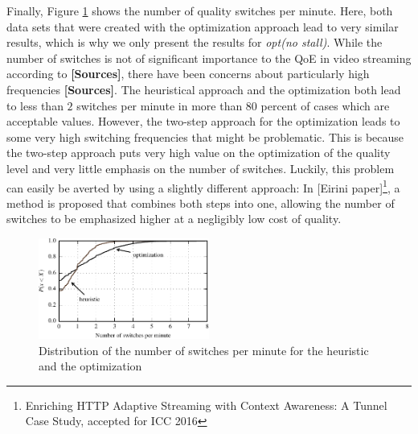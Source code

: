 Finally, Figure \ref{fig:switches} shows the number of quality switches per minute. Here, both data sets that were created with the optimization approach lead to very similar results, which is why we only present the results for \textit{opt(no stall)}. While the number of switches is not of significant importance to the QoE in video streaming according to \textbf{[Sources]}, there have been concerns about particularly high frequencies \textbf{[Sources]}. The heuristical approach and the optimization both lead to less than $2$ switches per minute in more than $80$ percent of cases which are acceptable values. However, the two-step approach for the optimization leads to some very high switching frequencies that might be problematic. This is because the two-step approach puts very high value on the optimization of the quality level and very little emphasis on the number of switches. Luckily, this problem can easily be averted by using a slightly different approach: In [Eirini paper]\footnote{Enriching HTTP Adaptive Streaming with Context Awareness: A Tunnel Case Study, accepted for ICC 2016}, a method is proposed that combines both steps into one, allowing the number of switches to be emphasized higher at a negligibly low cost of quality.

\begin{figure}[t]
\centering
\includegraphics[width=0.5\textwidth]{figs/switches_py}%
\caption{Distribution of the number of switches per minute for the heuristic and the optimization}
\label{fig:switches}%
\end{figure}

